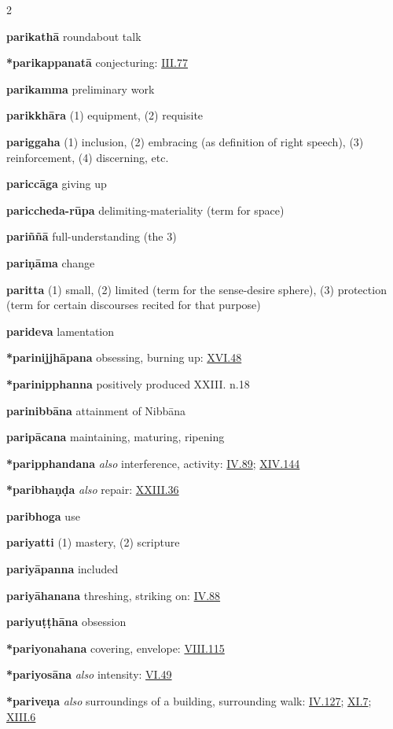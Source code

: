 \begin{multicols}{2}
\begin{vismHanging}
\par\textbf{parikathā} roundabout talk
\par\textbf{*parikappanatā} conjecturing: \hyperlink{III.77}{III.77}{}
\par\textbf{parikamma} preliminary work
\par\textbf{parikkhāra} (1) equipment, (2) requisite
\par\textbf{pariggaha} (1) inclusion, (2) embracing (as definition of right speech), (3) reinforcement, (4) discerning, etc. 
\par\textbf{pariccāga} giving up
\par\textbf{pariccheda-rūpa} delimiting-materiality (term for space) 
\par\textbf{pariññā} full-understanding (the 3)
\par\textbf{pariṇāma} change
\par\textbf{paritta} (1) small, (2) limited (term for the sense-desire sphere), (3) protection (term for certain discourses recited for that purpose) 
\par\textbf{parideva} lamentation
\par\textbf{*parinijjhāpana} obsessing, burning up: \hyperlink{XVI.48}{XVI.48}{} 
\par\textbf{*parinipphanna} positively produced XXIII. n.18 
\par\textbf{parinibbāna} attainment of Nibbāna
\par\textbf{paripācana} maintaining, maturing, ripening 
\par\textbf{*paripphandana} \emph{also }interference, activity: \hyperlink{IV.89}{IV.89}{}; \hyperlink{XIV.144}{XIV.144}{} 
\par\textbf{*paribhaṇḍa} \emph{also }repair: \hyperlink{XXIII.36}{XXIII.36}{}
\par\textbf{paribhoga} use
\par\textbf{pariyatti} (1) mastery, (2) scripture
\par\textbf{pariyāpanna} included
\par\textbf{pariyāhanana} threshing, striking on: \hyperlink{IV.88}{IV.88}{} 
\par\textbf{pariyuṭṭhāna} obsession
\par\textbf{*pariyonahana} covering, envelope: \hyperlink{VIII.115}{VIII.115}{} 
\par\textbf{*pariyosāna} \emph{also }intensity: \hyperlink{VI.49}{VI.49}{} 
\par\textbf{*pariveṇa} \emph{also} surroundings of a building, surrounding walk: \hyperlink{IV.127}{IV.127}{}; \hyperlink{XI.7}{XI.7}{}; \hyperlink{XIII.6}{XIII.6}{} 

\end{vismHanging}
\end{multicols}
